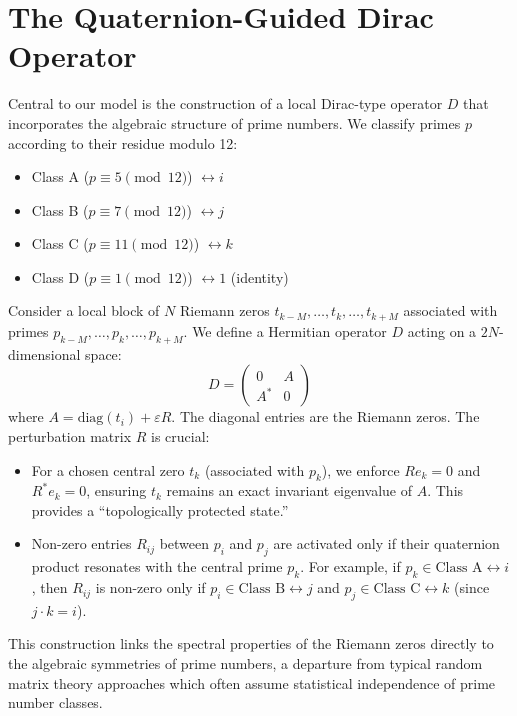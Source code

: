 \documentclass[11pt,twocolumn,a4paper]{article}
\newcommand{\eps}{\varepsilon}
\theoremstyle{definition}
\begin{document}
\section{The Quaternion-Guided Dirac Operator}
\label{sec:dirac_operator}
Central to our model is the construction of a local Dirac-type operator $D$ that incorporates the algebraic structure of prime numbers. We classify primes $p$ according to their residue modulo 12:
\begin{itemize}
    \item Class A ($p \equiv 5 \pmod{12}$) $\leftrightarrow i$
    \item Class B ($p \equiv 7 \pmod{12}$) $\leftrightarrow j$
    \item Class C ($p \equiv 11 \pmod{12}$) $\leftrightarrow k$
    \item Class D ($p \equiv 1 \pmod{12}$) $\leftrightarrow 1$ (identity)
\end{itemize}
Consider a local block of $N$ Riemann zeros $t_{k-M}, \dots, t_k, \dots, t_{k+M}$ associated with primes $p_{k-M}, \dots, p_k, \dots, p_{k+M}$. We define a Hermitian operator $D$ acting on a $2N$-dimensional space:
\begin{equation}
D = \begin{pmatrix} 0 & A \\ A^* & 0 \end{pmatrix}
\end{equation}
where $A = \text{diag}(t_i) + \eps R$. The diagonal entries are the Riemann zeros. The perturbation matrix $R$ is crucial:
\begin{itemize}
    \item For a chosen central zero $t_k$ (associated with $p_k$), we enforce $Re_k = 0$ and $R^*e_k = 0$, ensuring $t_k$ remains an exact invariant eigenvalue of $A$. This provides a ``topologically protected state.''
    \item Non-zero entries $R_{ij}$ between $p_i$ and $p_j$ are activated only if their quaternion product resonates with the central prime $p_k$. For example, if $p_k \in \text{Class A} \leftrightarrow i$, then $R_{ij}$ is non-zero only if $p_i \in \text{Class B} \leftrightarrow j$ and $p_j \in \text{Class C} \leftrightarrow k$ (since $j \cdot k = i$).
\end{itemize}
This construction links the spectral properties of the Riemann zeros directly to the algebraic symmetries of prime numbers, a departure from typical random matrix theory approaches which often assume statistical independence of prime number classes.
\end{document}
